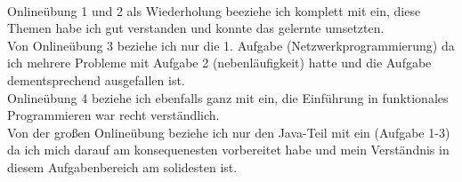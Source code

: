 \documentclass[10pt, a4paper]{article}
\begin{document}
\paragraph*{}
Onlineübung 1 und 2 als Wiederholung beeziehe ich komplett mit ein, diese Themen habe ich gut verstanden und konnte das gelernte umsetzten.\\
Von Onlineübung 3 beziehe ich nur die 1. Aufgabe (Netzwerkprogrammierung) da ich mehrere Probleme mit Aufgabe 2 (nebenläufigkeit) hatte und die Aufgabe dementsprechend ausgefallen ist.\\
Onlineübung 4 beziehe ich ebenfalls ganz mit ein, die Einführung in funktionales Programmieren war recht verständlich.\\
Von der großen Onlineübung beziehe ich nur den Java-Teil mit ein (Aufgabe 1-3) da ich mich darauf am konsequenesten vorbereitet habe und mein Verständnis in diesem Aufgabenbereich am solidesten ist.\par


\pagebreak

\end{document}
